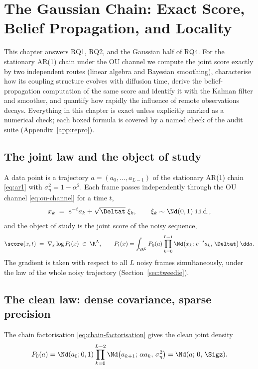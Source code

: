 \chapter{The Gaussian Chain: Exact Score, Belief Propagation, and
Locality}\label{ch:gaussian}

This chapter answers RQ1, RQ2, and the Gaussian half of RQ4. For the
stationary AR(1) chain under the OU channel we compute the joint score
exactly by two independent routes (linear algebra and Bayesian smoothing),
characterise how its coupling structure evolves with diffusion time,
derive the belief-propagation computation of the same score and identify
it with the Kalman filter and smoother, and quantify how rapidly the
influence of remote observations decays. Everything in this chapter is
exact unless explicitly marked as a numerical check; each boxed formula is
covered by a named check of the audit suite (Appendix~\ref{app:repro}).

\section{The joint law and the object of study}\label{sec:g-model}

A data point is a trajectory $a = (a_0, \dots, a_{L-1})$ of the stationary
AR(1) chain \eqref{eq:ar1} with $\sigma_\eta^2 = 1 - \alpha^2$. Each frame
passes independently through the OU channel \eqref{eq:ou-channel} for a
time $t$,
\begin{equation}
  x_k \;=\; e^{-t} a_k + \sqrt{\Deltat}\;\xi_k,
  \qquad \xi_k \sim \Nd(0,1)\ \text{i.i.d.},
  \label{eq:g-channel}
\end{equation}
and the object of study is the joint score of the noisy sequence,
\begin{equation}
  \score(x, t) \;=\; \nabla_x \log P_t(x) \;\in\; \R^L,
  \qquad
  P_t(x) = \int_{\R^L} P_0(a) \prod_{k=0}^{L-1}
    \Nd\big(x_k;\, e^{-t}a_k,\, \Deltat\big)\, \dd a .
  \label{eq:g-object}
\end{equation}
The gradient is taken with respect to all $L$ noisy frames simultaneously,
under the law of the whole noisy trajectory
(Section~\ref{sec:tweedie}).

\section{The clean law: dense covariance, sparse precision}
\label{sec:g-clean}

The chain factorisation \eqref{eq:chain-factorisation} gives the clean
joint density
\begin{equation}
  P_0(a)
  = \Nd(a_0; 0, 1) \prod_{k=0}^{L-2}
    \Nd\big(a_{k+1};\, \alpha a_k,\, \sigma_\eta^2\big)
  = \Nd(a;\, 0,\, \Sigz).
  \label{eq:g-P0}
\end{equation}

